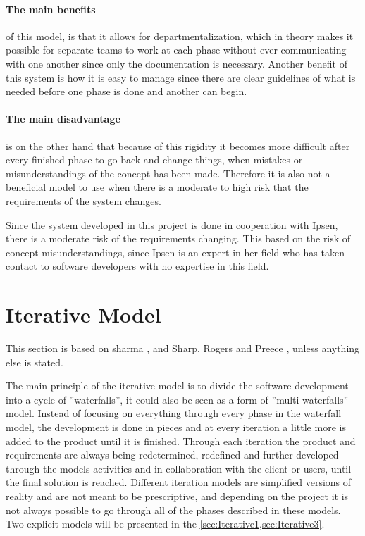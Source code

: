 \paragraph{The main benefits} of this model, is that it allows for departmentalization, which in theory makes it possible for separate teams to work at each phase without ever communicating with one another since only the documentation is necessary.
Another benefit of this system is how it is easy to manage since there are clear guidelines of what is needed before one phase is done and another can begin.

\paragraph{The main disadvantage} is on the other hand that because of this rigidity it becomes more difficult after every finished phase to go back and change things, when mistakes or misunderstandings of the concept has been made.
Therefore it is also not a beneficial model to use when there is a moderate to high risk that the requirements of the system changes.

Since the system developed in this project is done in cooperation with Ipsen, there is a moderate risk of the requirements changing.
This based on the risk of concept misunderstandings, since Ipsen is an expert in her field who has taken contact to software developers with no expertise in this field.

\section{Iterative Model} \label{sec:iterativModel}
This section is based on sharma \cite{Iterative-Toolsqa} , and Sharp, Rogers and Preece \cite{InteractionDesign}, unless anything else is stated.

The main principle of the iterative model is to divide the software development into a cycle of ''waterfalls'', it could also be seen as a form of ''multi-waterfalls'' model.
Instead of focusing on everything through every phase in the waterfall model, the development is done in pieces and at every iteration a little more is added to the product until it is finished.
Through each iteration the product and requirements are always being redetermined, redefined and further developed through the models activities and in collaboration with the client or users, until the final solution is reached.
Different iteration models are simplified versions of reality and are not meant to be prescriptive, and depending on the project it is not always possible to go through all of the phases described in these models. 
Two explicit models will be presented in the \cref{sec:Iterative1,sec:Iterative3}.


